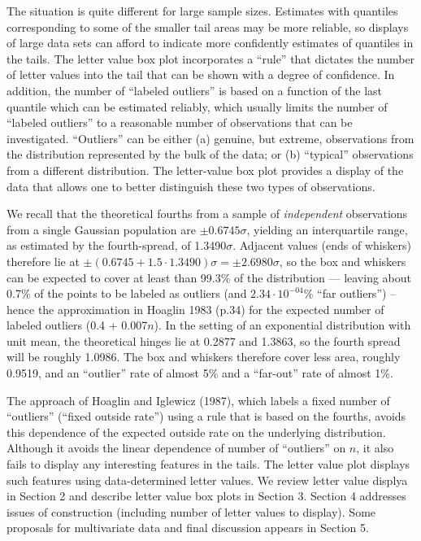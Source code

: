 \documentclass[oneside]{article}
\begin{document}
The situation is quite different for large sample sizes.
Estimates with quantiles corresponding to some of the smaller 
tail areas may be more reliable, so displays of large data sets 
can afford to indicate more confidently estimates of quantiles 
in the tails.  The letter
value box plot incorporates a ``rule'' that dictates the number of
letter values into the tail that can be shown with a degree of
confidence.  In addition, the number of ``labeled outliers'' is 
based on a function of the last quantile which can be estimated
reliably, which usually limits the number of ``labeled outliers'' 
to a reasonable number of observations that can be investigated.
``Outliers'' can be either (a) genuine, but extreme, observations
from the distribution represented by the bulk of the data; or 
(b) ``typical'' observations from a different distribution.
The letter-value box plot provides a display of the data that
allows one to better distinguish these two types of observations.

We recall that the theoretical fourths from a sample of
\textit{independent} observations from a single Gaussian 
population are $\pm  0.6745\sigma$, yielding an interquartile 
range, as estimated by the fourth-spread, of 1.3490$\sigma$.
Adjacent values (ends of whiskers) therefore lie at
$\pm (0.6745 + 1.5 \cdot 1.3490)\sigma = \pm 2.6980\sigma$,
so the box and whiskers can be expected to cover 
at least than 99.3\% of the distribution --- leaving 
about 0.7\% of the points to be labeled as outliers 
(and $2.34 \cdot 10^{-04}$\% ``far outliers'') -- hence the
approximation in Hoaglin 1983 (p.34) for the expected 
number of labeled outliers (0.4 + 0.007$n$).
In the setting of an exponential distribution with unit mean, 
the theoretical hinges lie at 0.2877 and 1.3863, so the fourth
spread will be roughly 1.0986.  The box and whiskers therefore
cover less area, roughly 0.9519, and an ``outlier'' rate
of almost 5\% and a ``far-out'' rate of almost 1\%.

The approach of Hoaglin and Iglewicz (1987), which
labels a fixed number of ``outliers'' (``fixed outside rate'')
using a rule that is based on the fourths, avoids this dependence 
of the expected outside rate on the underlying distribution.
Although it avoids the linear dependence of number of ``outliers''
on $n$, it also fails to display any interesting features in
the tails.  The letter value plot displays such features using
data-determined letter values.  We review letter value displya
in Section 2 and describe letter value box plots in Section 3.
Section 4 addresses issues of construction (including number
of letter values to display). Some proposals for multivariate
data and final discussion appears in Section 5.
\end{document}
